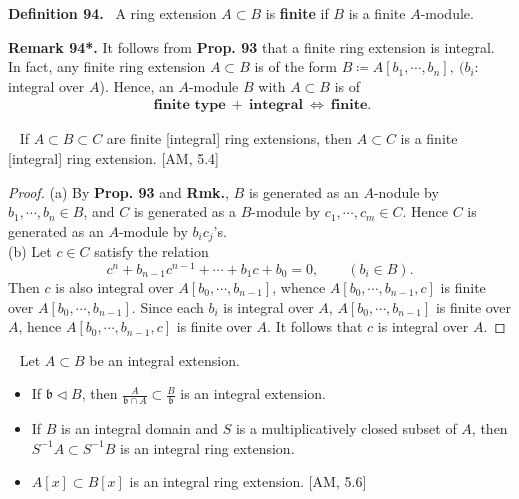 \documentclass[12pt,a4paper,footinclude=true,headinclude=true]{scrbook} %
\newenvironment{proposition}[2][]
{\renewcommand\theinnercustomprop{#2}\innercustomprop[#1] 
\begin{mdframed}[backgroundcolor=gray!20]\ }
{\end{mdframed}\endinnercustomprop}
\newenvironment{lemma}[2][]
{\renewcommand\theinnercustomlemma{#2}\innercustomlemma[#1]
\begin{mdframed}[backgroundcolor=gray!20]\ }
{\end{mdframed}\endinnercustomprop}
\newenvironment{definition}[2][Definition]
    { \begin{mdframed}[backgroundcolor=gray!20] \textbf{#1 #2.}\ }
    {  \end{mdframed}}
\newenvironment{remark}[2][Remark]
    { \begin{mdframed}[backgroundcolor=gray!20] \textbf{#1 #2.} }
    {  \end{mdframed}}
\begin{document}
\begin{definition}{94}
    A ring extension $A\subset B$ is \textbf{finite} if $B$ is a finite $A$-module.
\end{definition}
\begin{remark}{94*}
    It follows from \textbf{Prop. 93} that a finite ring extension is integral. In fact, any finite ring extension $A\subset B$ is of the form $B\coloneqq A[b_1,\cdots,b_n],\ (b_i:$ integral over $A$). Hence, an $A$-module $B$ with $A\subset B$ is of 
    \begin{align*}
        \textbf{ finite type}\ +\ \textbf{integral}\ \Longleftrightarrow\ \textbf{finite}. 
    \end{align*}
\end{remark}

\begin{proposition}{95}
    If $A\subset B\subset C$ are finite [integral] ring extensions, then $A\subset C$ is a finite [integral] ring extension. [AM, 5.4] 
\end{proposition}
\begin{proof}
    (a) By \textbf{Prop. 93} and \textbf{Rmk.}, $B$ is generated as an $A$-nodule by $b_1,\cdots,b_n\in B$, and $C$ is generated as a $B$-module by $c_1,\cdots,c_m\in C$. Hence $C$ is generated as an $A$-module by $b_ic_j$'s. \\ (b) Let $c\in C$ satisfy the relation 
    \begin{equation*}
        c^n+b_{n-1}c^{n-1}+\cdots+b_1c+b_0=0,\qquad (b_i\in B).
    \end{equation*}
    Then $c$ is also integral over $A[b_0,\cdots,b_{n-1}]$, whence $A[b_0,\cdots,b_{n-1},c]$ is finite over $A[b_0,\cdots,b_{n-1}]$. Since each $b_i$ is integral over $A$, $A[b_0,\cdots,b_{n-1}]$ is finite over $A$, hence $A[b_0,\cdots,b_{n-1},c]$ is finite over $A$. It follows that $c$ is integral over $A$.
\end{proof}
\newpage
\begin{lemma}{96}
    Let $A\subset B$ be an integral extension.
    \begin{itemize}
        \item[(a)] If $\mathfrak{b}\triangleleft B$, then $\frac{A}{\mathfrak{b}\cap A}\subset \frac{B}{\mathfrak{b}}$ is an integral extension.
        \item[(b)] If $B$ is an integral domain and $S$ is a multiplicatively closed subset of $A$, then $S^{-1}A\subset S^{-1}B$ is an integral ring extension.
        \item[(c)] $A[x]\subset B[x]$ is an integral ring extension. [AM, 5.6]
    \end{itemize}
\end{lemma}
\end{document}
